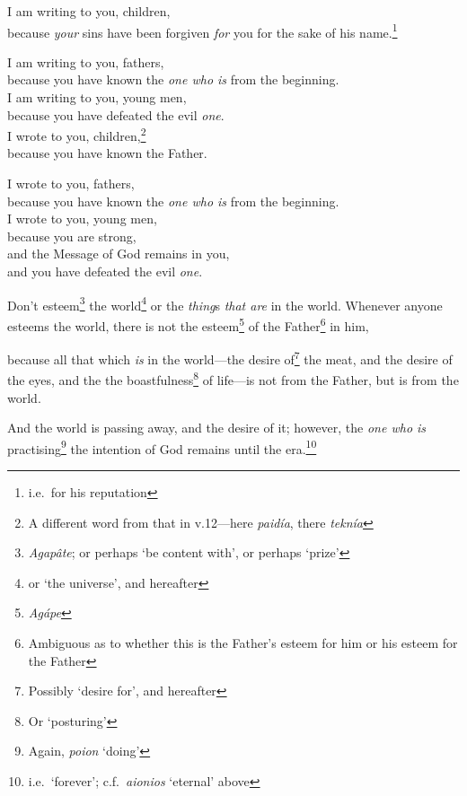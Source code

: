 \documentclass[article]{memoir}%
\newcounter{vnum}
\newcommand{\vnum}{%
	\textsuperscript{\thevnum}%
	\addtocounter{vnum}{1}%
}
\newcommand{\infer}[1]{\textit{#1}}
\newcommand{\focus}[1]{{#1}}
\newcommand{\lx}[1]{\textit{#1}}
\newcommand{\lxx}[2]{\textit{#1} `#2'}
\begin{document}
\indent \vnum I am writing to you, children,\\
\indent \indent because \infer{your} sins have been forgiven \infer{for} you for the sake of his name.\footnote{i.e.\ for his reputation} \\
\indent \vnum I am writing to you, fathers,\\
\indent \indent because you have known the \infer{one who is} from the beginning.\\
\indent I am writing to you, young men,\\
\indent \indent because you have defeated the evil \infer{one}.\\
\indent I wrote to you, children,\footnote{A different word from that in v.12---here \lx{paidía}, there \lx{teknía}}\\
\indent \indent because you have known the Father.\\
\indent \vnum I wrote to you, fathers,\\
\indent \indent because you have known the \infer{one who is} from the beginning.\\
\indent I wrote to you, young men,\\
\indent \indent because you are strong,\\
\indent \indent \indent and the Message of God remains in you,\\
\indent \indent \indent and you have defeated the evil \infer{one}.

\vnum Don't esteem\footnote{\lx{Agapâte}; or perhaps `be content with', or perhaps `prize'} the world\footnote{or `the universe', and hereafter} or the \infer{thing}s\infer{ that are} in the world. Whenever anyone esteems the world, there is not the esteem\footnote{\lx{Agápe}} of the Father\footnote{Ambiguous as to whether this is the Father's esteem for him or his esteem for the Father} in him, \vnum because all that which \infer{is} in the world---the desire of\footnote{Possibly `desire for', and hereafter} the meat, and the desire of the eyes, and the the boastfulness\footnote{Or `posturing'} of life---is \focus{not} from the Father, but is \focus{from the world}. \vnum And the world is passing away, and the desire of it; however, the \infer{one who is} practising\footnote{Again, \lxx{poion}{doing}} the intention of God remains until the era.\footnote{i.e.\ `forever'; c.f.\ \lxx{aionios}{eternal} above}
\end{document}
